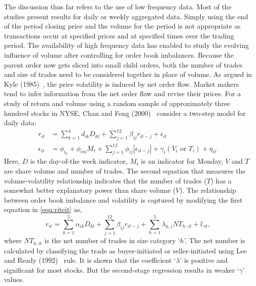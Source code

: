 The discussion thus far refers to the use of low frequency data. Most of the studies present results for daily or weekly aggregated data. Simply using the end of the period closing price and the volume for the period is not appropriate as transactions occur at specified prices and at specified times over the trading period. The availability of high frequency data has enabled to study the evolving influence of volume after controlling for order book imbalances. Because the parent order now gets sliced into small child orders, both the number of trades and size of trades need to be considered together in place of volume. As argued in Kyle (1985)~\cite{kyle1985}, the price volatility is induced by net order flow. Market makers tend to infer information from the net order flow and revise their prices. For a study of return and volume using a random sample of approximately three hundred stocks in NYSE, Chan and Fong (2000)~\cite{chanfong} consider a two-step model for daily data: 
	\begin{equation} \label{eqn:riteit}
	\begin{split}
	r_{it} &= \sum_{k=1}^4 d_{ik} D_{kt} + \sum_{j=1}^{12} \beta_{ij} r_{it-j} + \epsilon_{it} \\
	\epsilon_{it} &= \phi_{i_0} + \phi_{im} M_t + \sum_{j=1}^{12} \phi_{ij} |\epsilon_{it-j}| + \gamma_i (V_i \text{ or }T_i) + \eta_{it}.
	\end{split}
	\end{equation}
Here, $D$ is the day-of-the week indicator, $M_t$ is an indicator for Monday, $V$ and $T$ are share volume and number of trades. The second equation that measures the volume-volatility relationship indicates that the number of trades ($T$) has a somewhat better explanatory power than share volume ($V$). The relationship between order book imbalance and volatility is captured by modifying the first equation in \eqref{eqn:riteit} as,
	\begin{equation} \label{eqn:rit32}
	r_{it}= \sum_{k=1}^5 \alpha_{ik} D_{kt} + \sum_{j=1}^{12} \beta_{ij} r_{it-j} + \sum_{h=1}^5 \lambda_{h,i} N T_{h\cdot it} + \Eulerconst_{it},
	\end{equation}
where $NT_{h,it}$ is the net number of trades in size category `$h$'. The net number is calculated by classifying the trade as buyer-initiated or seller-initiated using Lee and Ready (1992)~\cite{leeready} rule. It is shown that the coefficient `$\lambda$' is positive and significant for most stocks. But the second-stage regression results in weaker `$\gamma$' values. 


